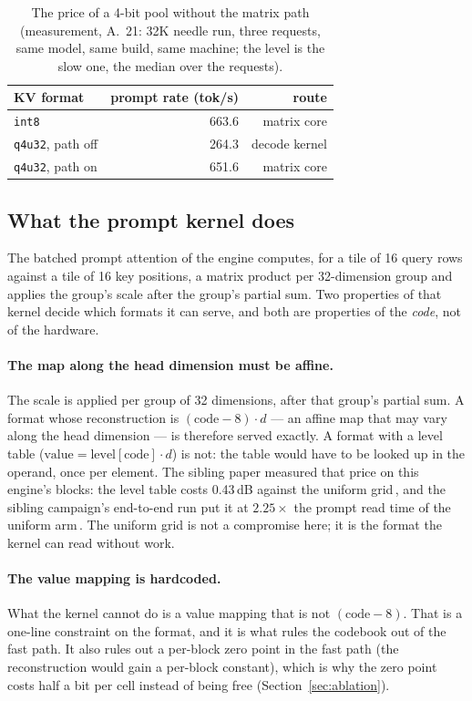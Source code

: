 \documentclass[10pt,twocolumn]{article}
\begin{document}
\begin{table}[t]
\centering
\caption{The price of a 4-bit pool without the matrix path (measurement, A.~21: 32K needle run, three
requests, same model, same build, same machine; the level is the slow one, the median over the requests).}
\label{tab:price}
\begin{tabular}{lrr}
\toprule
KV format & prompt rate (tok/s) & route \\
\midrule
\texttt{int8}                & 663.6 & matrix core \\
\texttt{q4u32}, path off     & 264.3 & decode kernel \\
\texttt{q4u32}, path on      & 651.6 & matrix core \\
\bottomrule
\end{tabular}
\end{table}

\subsection{What the prompt kernel does}
\label{sec:kernel}

The batched prompt attention of the engine computes, for a tile of 16 query rows against a tile of 16 key
positions, a matrix product per 32-dimension group and applies the group's scale after the group's partial
sum. Two properties of that kernel decide which formats it can serve, and both are properties of the
\emph{code}, not of the hardware.

\paragraph{The map along the head dimension must be affine.} The scale is applied per group of 32
dimensions, after that group's partial sum. A format whose reconstruction is
$(\text{code}-8)\cdot d$ --- an affine map that may vary along the head dimension --- is therefore served
exactly. A format with a level table ($\text{value}=\text{level}[\text{code}]\cdot d$) is not: the table
would have to be looked up in the operand, once per element. The sibling paper measured that price on this
engine's blocks: the level table costs 0.43\,dB against the uniform grid\,\cite{shear}, and the sibling
campaign's end-to-end run put it at $2.25\times$ the prompt read time of the uniform arm\,\cite{shear}. The
uniform grid is not a compromise here; it is the format the kernel can read without work.

\paragraph{The value mapping is hardcoded.} What the kernel cannot do is a value mapping that is not
$(\text{code}-8)$. That is a one-line constraint on the format, and it is what rules the codebook out of
the fast path. It also rules out a per-block zero point in the fast path (the reconstruction would gain a
per-block constant), which is why the zero point costs half a bit per cell instead of being free
(Section~\ref{sec:ablation}).
\end{document}
